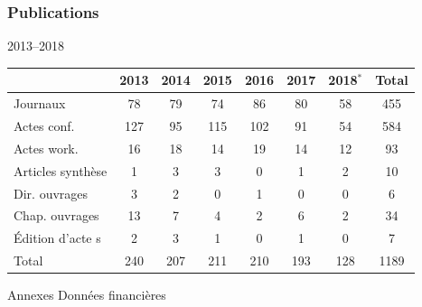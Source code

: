 \documentclass[]{beamer}
\begin{document}
\begin{frame}
  \frametitle{Publications}

  \begin{block}{2013--2018}
  	\begin{center}
    	{\small%
    		\begin{tabular}{@{}lccccccc@{}}
      		\toprule
      		 & 2013 & 2014 & 2015 & 2016 & 2017 & 2018$^*$ & Total \\
      		\midrule
      		Journaux & 78 & 79 & 74 & 86 & 80 & 58 & 455 \\
      		Actes conf. & 127 & 95 & 115 & 102 & 91 & 54 & 584 \\
      		Actes work. & 16 & 18 & 14 & 19 & 14 & 12 & 93 \\
      		Articles synthèse & 1 & 3 & 3 & 0 & 1 & 2 & 10 \\
      		Dir. ouvrages & 3& 2& 0& 1& 0& 0& 6 \\
      		Chap. ouvrages & 13 & 7 & 4 & 2 & 6 & 2 & 34 \\
      		\'Edition d'acte s & 2 &  3 & 1 & 0 & 1 & 0 & 7 \\
      		\midrule
      		Total &240& 207& 211& 210& 193& 128& 1189 \\
      		\bottomrule
    		\end{tabular}
      }%
  	\end{center}
  \end{block}

\end{frame}


\begin{frame}[label=conclusion, standout]{Annexes}
  Données financières
\end{frame}

\end{document}
